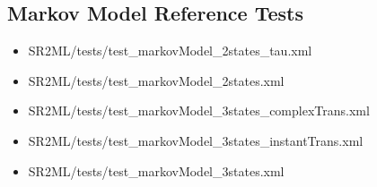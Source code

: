 \subsection{Markov Model Reference Tests}
\begin{itemize}
	\item SR2ML/tests/test\_markovModel\_2states\_tau.xml
	\item SR2ML/tests/test\_markovModel\_2states.xml
	\item SR2ML/tests/test\_markovModel\_3states\_complexTrans.xml
	\item SR2ML/tests/test\_markovModel\_3states\_instantTrans.xml
	\item SR2ML/tests/test\_markovModel\_3states.xml
\end{itemize}
